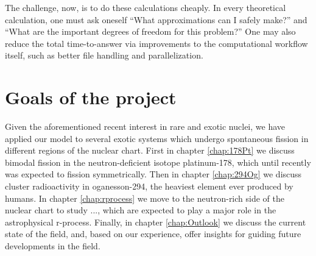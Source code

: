 The challenge, now, is to do these calculations cheaply. In every theoretical calculation, one must ask oneself ``What approximations can I safely make?'' and ``What are the important degrees of freedom for this problem?'' One may also reduce the total time-to-answer via improvements to the computational workflow itself, such as better file handling and parallelization.

\section{Goals of the project}
Given the aforementioned recent interest in rare and exotic nuclei, we have applied our model to several exotic systems which undergo spontaneous fission in different regions of the nuclear chart. First in chapter \ref{chap:178Pt} we discuss bimodal fission in the neutron-deficient isotope platinum-178, which until recently was expected to fission symmetrically. Then in chapter \ref{chap:294Og} we discuss cluster radioactivity in oganesson-294, the heaviest element ever produced by humans. In chapter \ref{chap:rprocess} we move to the neutron-rich side of the nuclear chart to study ..., which are expected to play a major role in the astrophysical r-process. Finally, in chapter \ref{chap:Outlook} we discuss the current state of the field, and, based on our experience, offer insights for guiding future developments in the field.